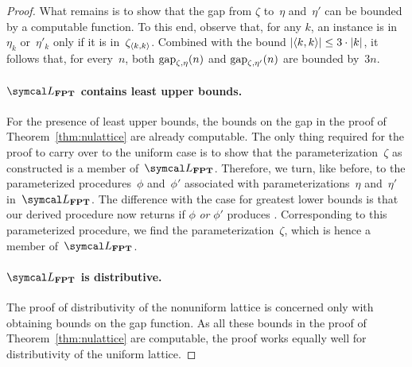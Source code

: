 \begin{proof}
  What remains is to show that the gap from $\zeta$ to~$\eta$ and~$\eta'$ can be bounded by a computable function.
  To this end, observe that, for any $k$, an instance is in~$\eta_k$ or~$\eta'_k$ only if it is in~$\zeta_{{\langle k, k\rangle}}$.
  Combined with the bound ${\lvert{\langle k, k\rangle}\rvert} \le 3 \cdot {\lvert k\rvert}$, it follows that, for every~$n$, both $\operatorname{gap}_{\zeta, \eta}(n)$ and $\operatorname{gap}_{\zeta, \eta'}(n)$ are bounded by~$3n$.

  \paragraph{$\calL_\cl{FPT}$ contains least upper bounds.}
  For the presence of least upper bounds, the bounds on the gap in the proof of Theorem~\ref{thm:nulattice} are already computable.
  The only thing required for the proof to carry over to the uniform case is to show that the parameterization~$\zeta$ as constructed is a member of~$\calL_\cl{FPT}$.
  Therefore, we turn, like before, to the parameterized procedures~$\phi$ and~$\phi'$ associated with parameterizations~$\eta$ and~$\eta'$ in~$\calL_\cl{FPT}$.
  The difference with the case for greatest lower bounds is that our derived  procedure now returns  if $\phi$ \emph{or} $\phi'$ produces .
  Corresponding to this parameterized procedure, we find the parameterization~$\zeta$, which is hence a member of~$\calL_\cl{FPT}$.

  \paragraph{$\calL_\cl{FPT}$ is distributive.}
  The proof of distributivity of the nonuniform lattice is concerned only with obtaining bounds on the gap function.
  As all these bounds in the proof of Theorem~\ref{thm:nulattice} are computable, the proof works equally well for distributivity of the uniform lattice.
\end{proof}

